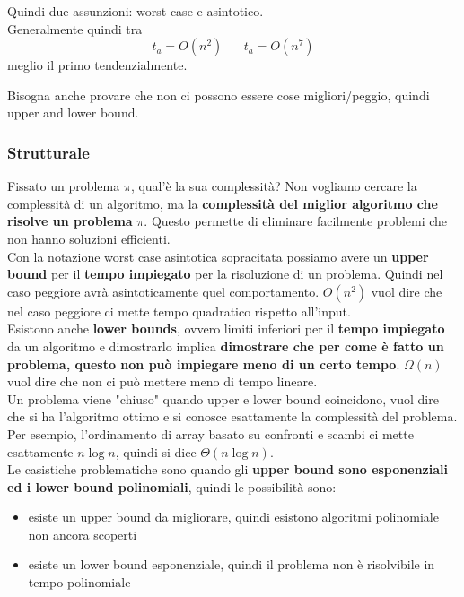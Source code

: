 \documentclass[11pt]{article}
\begin{document}
	Quindi due assunzioni: worst-case e asintotico. \\
	
	Generalmente quindi tra
	$$ t_a = O (n^2) \;\;\;\;\;\; t_a = O(n^7)$$
	meglio il primo tendenzialmente.
	
	Bisogna anche provare che non ci possono essere cose migliori/peggio, quindi upper and lower bound.\\

	\newpage
	
	\subsubsection{Strutturale}
	
	Fissato un problema $\pi$, qual'è la sua complessità? Non vogliamo cercare la complessità di un algoritmo, ma la \textbf{complessità del miglior algoritmo che risolve un problema} $\pi$. Questo permette di eliminare facilmente problemi che non hanno soluzioni efficienti.\\
	
	Con la notazione worst case asintotica sopracitata possiamo avere un \textbf{upper bound} per il \textbf{tempo impiegato} per la risoluzione di un problema. Quindi nel caso peggiore avrà asintoticamente quel comportamento. $O(n^2)$ vuol dire che nel caso peggiore ci mette tempo quadratico rispetto all'input.\\
	
	Esistono anche \textbf{lower bounds}, ovvero limiti inferiori per il \textbf{tempo impiegato} da un algoritmo e dimostrarlo implica \textbf{dimostrare che per come è fatto un problema, questo non può impiegare meno di un certo tempo}. $\Omega(n)$ vuol dire che non ci può mettere meno di tempo lineare.\\
	
	Un problema viene "chiuso" quando upper e lower bound coincidono, vuol dire che si ha l'algoritmo ottimo e si conosce esattamente la complessità del problema. Per esempio, l'ordinamento di array basato su confronti e scambi ci mette esattamente $n \log n$, quindi si dice $\Theta(n \log n)$.\\
	
	Le casistiche problematiche sono quando gli \textbf{upper bound sono esponenziali ed i lower bound polinomiali}, quindi le possibilità sono: 
	\begin{itemize}
		\item esiste un upper bound da migliorare, quindi esistono algoritmi polinomiale non ancora scoperti
		\item esiste un lower bound esponenziale, quindi il problema non è risolvibile in tempo polinomiale
	\end{itemize}
	
\end{document}
